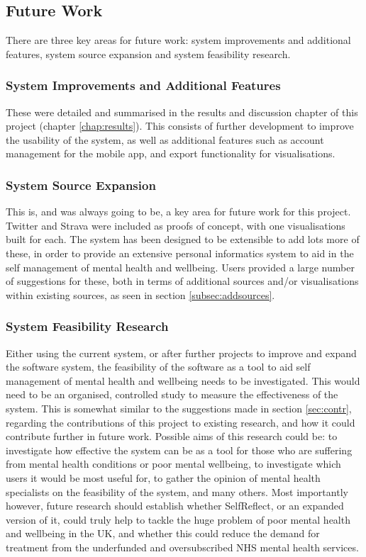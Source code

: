 \documentclass[11pt,openright,a4paper]{report}
\begin{document}
\subsection{Future Work}
There are three key areas for future work: system improvements and additional features, system source expansion and system feasibility research.

\subsubsection{System Improvements and Additional Features}
These were detailed and summarised in the results and discussion chapter of this project (chapter \ref{chap:results}). This consists of further development to improve the usability of the system, as well as additional features such as account management for the mobile app, and export functionality for visualisations.

\subsubsection{System Source Expansion}
This is, and was always going to be, a key area for future work for this project. Twitter and Strava were included as proofs of concept, with one visualisations built for each. The system has been designed to be extensible to add lots more of these, in order to provide an extensive personal informatics system to aid in the self management of mental health and wellbeing. Users provided a large number of suggestions for these, both in terms of additional sources and/or visualisations within existing sources, as seen in section \ref{subsec:addsources}.

\subsubsection{System Feasibility Research}
Either using the current system, or after further projects to improve and expand the software system, the feasibility of the software as a tool to aid self management of mental health and wellbeing needs to be investigated. This would need to be an organised, controlled study to measure the effectiveness of the system. This is somewhat similar to the suggestions made in section \ref{sec:contr}, regarding the contributions of this project to existing research, and how it could contribute further in future work. Possible aims of this research could be: to investigate how effective the system can be as a tool for those who are suffering from mental health conditions or poor mental wellbeing, to investigate which users it would be most useful for, to gather the opinion of mental health specialists on the feasibility of the system, and many others. Most importantly however, future research should establish whether SelfReflect, or an expanded version of it, could truly help to tackle the huge problem of poor mental health and wellbeing in the UK, and whether this could reduce the demand for treatment from the underfunded and oversubscribed NHS mental health services.
\end{document}
